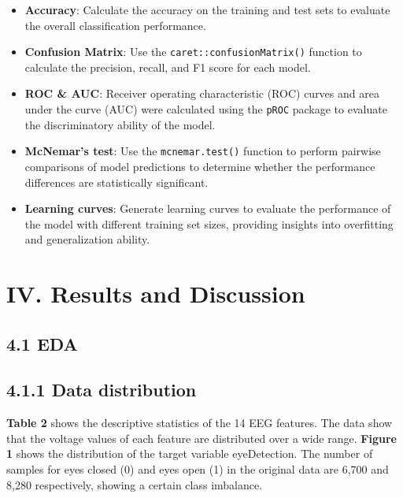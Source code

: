 \documentclass[
  doc]{apa6}
\providecommand{\tightlist}{%
  \setlength{\itemsep}{0pt}\setlength{\parskip}{0pt}}
\begin{document}
\begin{itemize}
\tightlist
\item
  \textbf{Accuracy}: Calculate the accuracy on the training and test sets to evaluate the overall classification performance.
\item
  \textbf{Confusion Matrix}: Use the \texttt{caret::confusionMatrix()} function to calculate the precision, recall, and F1 score for each model.
\item
  \textbf{ROC \& AUC}: Receiver operating characteristic (ROC) curves and area under the curve (AUC) were calculated using the \texttt{pROC} package to evaluate the discriminatory ability of the model.
\item
  \textbf{McNemar's test}: Use the \texttt{mcnemar.test()} function to perform pairwise comparisons of model predictions to determine whether the performance differences are statistically significant.
\item
  \textbf{Learning curves}: Generate learning curves to evaluate the performance of the model with different training set sizes, providing insights into overfitting and generalization ability.
\end{itemize}

\newpage

\section{IV. Results and Discussion}\label{iv.-results-and-discussion}

\subsection{4.1 EDA}\label{eda}

\subsection{4.1.1 Data distribution}\label{data-distribution}

\textbf{Table 2} shows the descriptive statistics of the 14 EEG features. The data show that the voltage values of each feature are distributed over a wide range. \textbf{Figure 1} shows the distribution of the target variable eyeDetection. The number of samples for eyes closed (0) and eyes open (1) in the original data are 6,700 and 8,280 respectively, showing a certain class imbalance.
\end{document}

